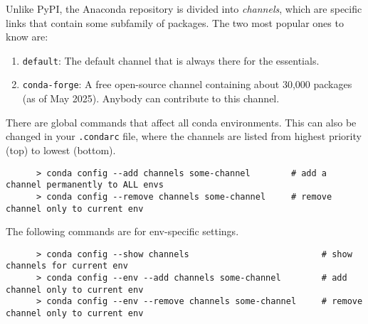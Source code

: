  Unlike PyPI, the Anaconda repository is divided into \textit{channels}, which are specific links that contain some subfamily of packages. The two most popular ones to know are: 
  \begin{enumerate}
    \item \texttt{default}: The default channel that is always there for the essentials. 
    \item \texttt{conda-forge}: A free open-source channel containing about 30,000 packages (as of May 2025). Anybody can contribute to this channel. 
  \end{enumerate} 

  \begin{example}
    There are global commands that affect all conda environments. This can also be changed in your \texttt{.condarc} file, where the channels are listed from highest priority (top) to lowest (bottom). 
    \begin{lstlisting}
      > conda config --add channels some-channel        # add a channel permanently to ALL envs 
      > conda config --remove channels some-channel     # remove channel only to current env 
    \end{lstlisting}

    The following commands are for env-specific settings. 
    \begin{lstlisting}
      > conda config --show channels                          # show channels for current env
      > conda config --env --add channels some-channel        # add channel only to current env 
      > conda config --env --remove channels some-channel     # remove channel only to current env 
    \end{lstlisting}
  \end{example} 
  
